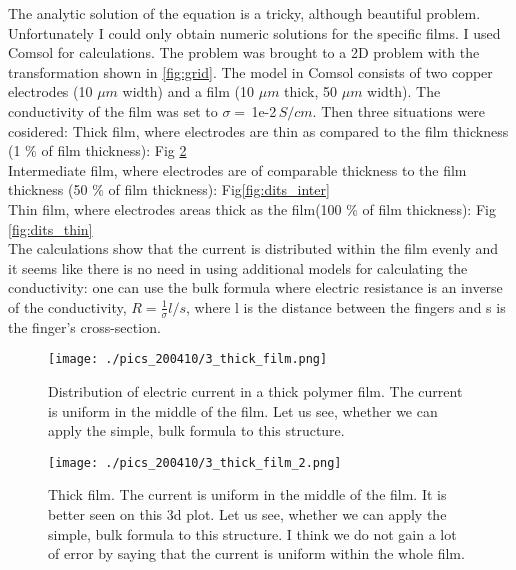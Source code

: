 \documentclass[12pt,a4paper]{report}
\begin{document}
The analytic solution of the equation is a tricky, although beautiful problem. Unfortunately I could only obtain numeric solutions for the specific films. I used Comsol for calculations. The problem was brought to a 2D problem with the transformation shown in \ref{fig:grid}. The model in Comsol consists of two copper electrodes (10 $\mu m$ width) and a film (10 $\mu m$ thick, 50 $\mu m$ width). The conductivity of the film was set to $\sigma =\,$1e-2$\,S/cm$. Then three situations were cosidered:
Thick film, where electrodes are thin as compared to the film thickness (1 \% of film thickness): Fig \ref{fig:dits_thick}\\
Intermediate film, where electrodes are of comparable thickness to the film thickness (50 \% of film thickness): Fig\ref{fig:dits_inter}\\
Thin film, where electrodes areas thick as the film(100 \% of film thickness): Fig \ref{fig:dits_thin}\\
 
The calculations show that the current is distributed within the film evenly and it seems like there is no need in using additional models for calculating the conductivity: one can use the bulk formula where electric resistance is an inverse of the conductivity, $R = \frac{1}{\sigma}l/s$, where l is the distance between the fingers and s is the finger's cross-section.

\begin{figure} [!ht]
\begin{center}
       \texttt{[image: ./pics\_200410/3\_thick\_film.png]}
       \end{center}
\caption{Distribution of electric current in a thick polymer film. The current is uniform in the middle of the film. Let us see, whether we can apply the simple, bulk formula to this structure.}
     \label{fig:dits_thick}
\end{figure}

\begin{figure} [!ht]
\begin{center}
       \texttt{[image: ./pics\_200410/3\_thick\_film\_2.png]}
       \end{center}
\caption{Thick film. The current is uniform in the middle of the film. It is better seen on this 3d plot. Let us see, whether we can apply the simple, bulk formula to this structure. I think we do not gain a lot of error by saying that the current is uniform within the whole film.}
     \label{fig:dits_thick}
\end{figure}
\end{document}
